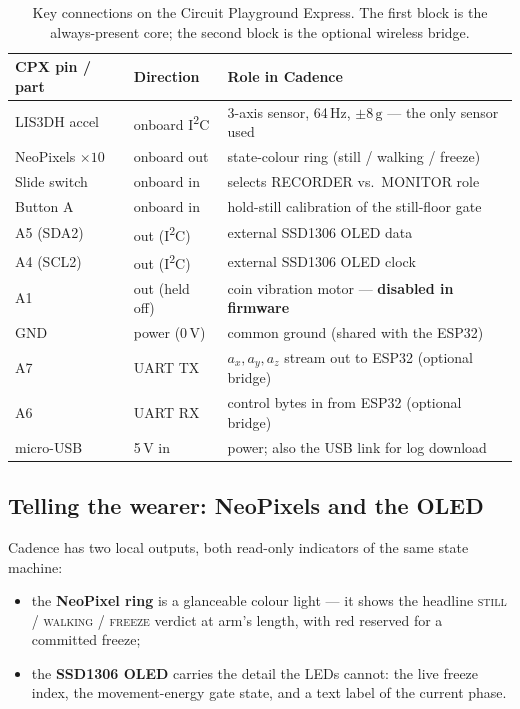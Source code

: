 \begin{table}[H]
  \centering
  \small
  \caption{Key connections on the Circuit Playground Express. The first block is the
  always-present core; the second block is the optional wireless bridge.}
  \label{tab:pins}
  \begin{tabular}{@{}llp{6.2cm}@{}}
    \toprule
    \textbf{CPX pin / part} & \textbf{Direction} & \textbf{Role in Cadence} \\
    \midrule
    LIS3DH accel  & onboard I\textsuperscript{2}C & 3-axis sensor, 64\,Hz, \(\pm 8\,\mathrm{g}\) --- the only sensor used \\
    NeoPixels \(\times 10\) & onboard out & state-colour ring (still / walking / freeze) \\
    Slide switch  & onboard in & selects RECORDER vs.\ MONITOR role \\
    Button A      & onboard in & hold-still calibration of the still-floor gate \\
    A5 (SDA2)     & out (I\textsuperscript{2}C) & external SSD1306 OLED data \\
    A4 (SCL2)     & out (I\textsuperscript{2}C) & external SSD1306 OLED clock \\
    A1            & out (held off) & coin vibration motor --- \textbf{disabled in firmware} \\
    GND           & power (0\,V) & common ground (shared with the ESP32) \\
    \addlinespace
    A7            & UART TX & \(a_x,a_y,a_z\) stream out to ESP32 (optional bridge) \\
    A6            & UART RX & control bytes in from ESP32 (optional bridge) \\
    micro-USB     & 5\,V in & power; also the USB link for log download \\
    \bottomrule
  \end{tabular}
\end{table}

\subsection{Telling the wearer: NeoPixels and the OLED}

Cadence has two local outputs, both read-only indicators of the same state machine:

\begin{itemize}
  \item the \textbf{NeoPixel ring} is a glanceable colour light --- it shows the
        headline \textsc{still} / \textsc{walking} / \textsc{freeze} verdict at arm's
        length, with red reserved for a committed freeze;
  \item the \textbf{SSD1306 OLED} carries the detail the LEDs cannot: the live freeze
        index, the movement-energy gate state, and a text label of the current phase.
\end{itemize}


